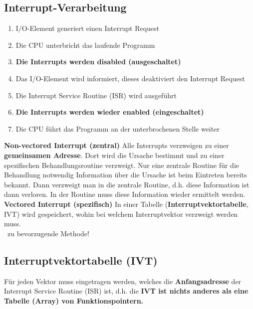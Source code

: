 \subsection{Interrupt-Verarbeitung}

\begin{enumerate}
    \item I/O-Element generiert einen Interrupt Request
    \item Die CPU unterbricht das laufende Programm
    \item \textbf{Die Interrupts werden disabled (ausgeschaltet)}
    \item Das I/O-Element wird informiert, dieses deaktiviert den Interrupt Request
    \item Die Interrupt Service Routine (ISR) wird ausgeführt
    \item \textbf{Die Interrupts werden wieder enabled (eingeschaltet)}
    \item Die CPU führt das Programm an der unterbrochenen Stelle weiter
\end{enumerate}



\begin{outline}
    \1 \textbf{Non-vectored Interrupt (zentral)}
        \2 Alle Interrupts verzweigen zu einer \textbf{gemeinsamen Adresse}. Dort wird die Ursache bestimmt und zu einer
            spezifischen Behandlungsroutine verzweigt.
        \2[+] Nur eine zentrale Routine für die Behandlung notwendig
        \2[-] Information über die Ursache ist beim Eintreten bereits bekannt. Dann
                verzweigt man in die zentrale Routine, d.h. diese Information ist dann verloren. In der Routine muss diese
                Information wieder ermittelt werden.
    \1 \textbf{Vectored Interrupt (spezifisch)}
        \2 In einer Tabelle (\textbf{Interruptvektortabelle}, IVT) wird gespeichert, wohin bei welchem Interruptvektor
            verzweigt werden muss. \\
            \textrightarrow\ zu bevorzugende Methode!
\end{outline}


\subsection{Interruptvektortabelle (IVT)}

Für jeden Vektor muss eingetragen werden, welches die \textbf{Anfangsadresse} der Interrupt Service Routine
(ISR) ist, d.h. die \textbf{IVT ist nichts anderes als eine Tabelle (Array) von Funktionspointern.}

